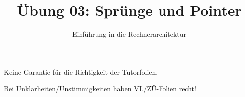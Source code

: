 


\title{Übung 03: Sprünge und Pointer}
\subtitle{Einführung in die Rechnerarchitektur}
\date{}



\maketitle

\begin{frame}[c]{}{}
	\begin{center}
		\LARGE  Keine Garantie für die Richtigkeit der Tutorfolien.

		\Large Bei Unklarheiten/Unstimmigkeiten haben VL/ZÜ-Folien recht!
	\end{center}
\end{frame}

